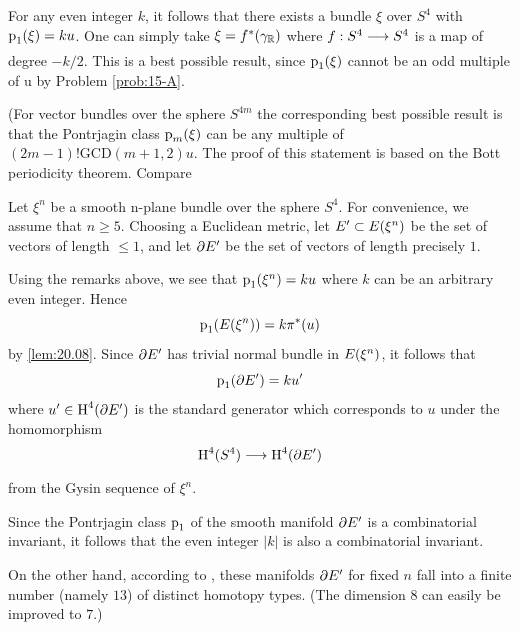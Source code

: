 \documentclass[../main]{subfiles}
\begin{document}
For any even integer $k$, it follows that there exists a bundle $\xi$ over $S^{4}$ with $\operatorname{p}_{1}(\xi)=ku$. One can simply take $\xi=f^{*}(\gamma_{\mathbb{R}})$ where $f: S^{4} \varrightarrow{} S^{4}$ is a map of degree $-k / 2$. This is a best possible result, since $\operatorname{p}_{1}(\xi)$ cannot be an odd multiple of u by Problem \ref{prob:15-A}.

(For vector bundles over the sphere $S^{4 m}$ the corresponding best possible result is that the Pontrjagin class $\operatorname{p}_{m}(\xi)$ can be any multiple of \newline $(2m-1)!\mathrm{GCD}(m+1,2) u$. The proof of this statement is based on the Bott periodicity theorem. Compare \cite{bott1970}
\setcounter{example}{0}

\begin{example}
Let $\xi^{n}$ be a smooth n-plane bundle over the sphere $S^{4}$. For convenience, we assume that $n \geq 5$. Choosing a Euclidean metric, let $E^{\prime} \subset E(\xi^{n})$ be the set of vectors of length $\leq 1$, and let $\partial E^{\prime}$ be the set of vectors of length precisely $1 .$
\end{example} 

Using the remarks above, we see that $\operatorname{p}_{1}(\xi^{n})=ku$ where $k$ can be an arbitrary even integer. Hence
\[
\operatorname{p}_{1}(E(\xi^{n}))=k \pi^{*}(u)
\]
by \ref{lem:20.08}. Since $\partial E^{\prime}$ has trivial normal bundle in $E(\xi^{n})$, it follows that
\[
\operatorname{p}_{1}(\partial E^{\prime})=ku^{\prime}
\]
where $u^{\prime} \in \operatorname{H}^{4}(\partial E^{\prime})$ is the standard generator which corresponds to $u$ under the homomorphism
\[
\homology^{4}(S^{4}) \varrightarrow{} \homology^{4}(\partial \total^{\prime})
\]
from the Gysin sequence of $\xi^{n}$.

Since the Pontrjagin class $\operatorname{p}_{1}$ of the smooth manifold $\partial E^{\prime}$ is a combinatorial invariant, it follows that the even integer $|k|$ is also a combinatorial invariant. 

On the other hand, according to \cite{james1954}, these manifolds $\partial E^{\prime}$ for fixed $n$ fall into a finite number (namely $13$) of distinct homotopy types.  (The dimension $8$ can easily be improved to $7$.)
\end{document}
